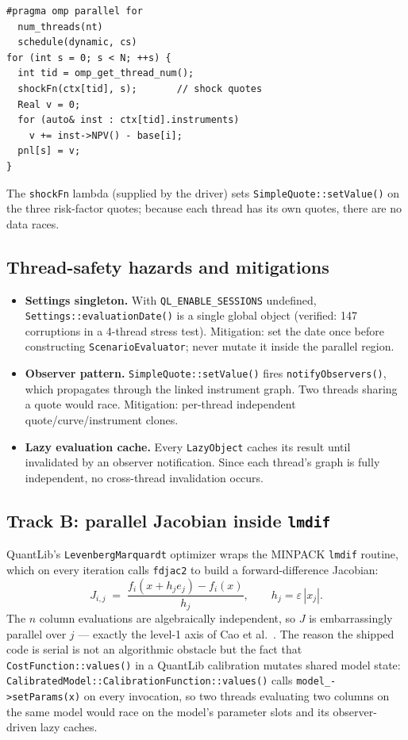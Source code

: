 \documentclass[11pt,twocolumn]{article}
\begin{document}
\begin{lstlisting}
#pragma omp parallel for
  num_threads(nt)
  schedule(dynamic, cs)
for (int s = 0; s < N; ++s) {
  int tid = omp_get_thread_num();
  shockFn(ctx[tid], s);       // shock quotes
  Real v = 0;
  for (auto& inst : ctx[tid].instruments)
    v += inst->NPV() - base[i];
  pnl[s] = v;
}
\end{lstlisting}

\noindent
The \texttt{shockFn} lambda (supplied by the driver) sets
\texttt{SimpleQuote::setValue()} on the three risk-factor quotes;
because each thread has its own quotes, there are no data races.

\subsection{Thread-safety hazards and mitigations}

\begin{itemize}[noitemsep]
  \item \textbf{Settings singleton.}  With \texttt{QL\_ENABLE\_SESSIONS}
    undefined, \texttt{Settings::evaluationDate()} is a single global
    object (verified: 147 corruptions in a 4-thread stress test).
    Mitigation: set the date once before constructing
    \texttt{ScenarioEvaluator}; never mutate it inside the parallel
    region.
  \item \textbf{Observer pattern.}  \texttt{SimpleQuote::setValue()}
    fires \texttt{notifyObservers()}, which propagates through
    the linked instrument graph.  Two threads sharing a quote would
    race.  Mitigation: per-thread independent quote/curve/instrument
    clones.
  \item \textbf{Lazy evaluation cache.}  Every \texttt{LazyObject}
    caches its result until invalidated by an observer notification.
    Since each thread's graph is fully independent, no cross-thread
    invalidation occurs.
\end{itemize}

\subsection{Track B: parallel Jacobian inside \texttt{lmdif}}
\label{sec:trackB}

QuantLib's \texttt{LevenbergMarquardt} optimizer wraps the MINPACK
\texttt{lmdif} routine, which on every iteration calls
\texttt{fdjac2} to build a forward-difference Jacobian:
\begin{equation*}
J_{i,j} \;=\; \frac{f_i(x + h_j e_j) - f_i(x)}{h_j},
\qquad h_j = \varepsilon\,|x_j|.
\end{equation*}
The $n$ column evaluations are algebraically independent, so
$J$ is embarrassingly parallel over $j$ --- exactly the level-1
axis of Cao et al.~\cite{cao2009}.  The reason the shipped code is
serial is not an algorithmic obstacle but the fact that
\texttt{CostFunction::values()} in a QuantLib calibration mutates
shared model state:
\texttt{CalibratedModel::CalibrationFunction::values()} calls
\texttt{model\_->setParams(x)} on every invocation, so two threads
evaluating two columns on the same model would race on the model's
parameter slots and its observer-driven lazy caches.
\end{document}

